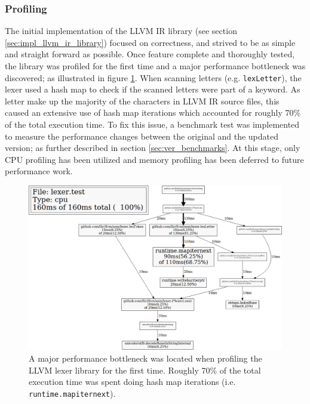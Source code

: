 
\subsubsection{Profiling}
\label{sec:ver_profiling}

The initial implementation of the LLVM IR library (see section \ref{sec:impl_llvm_ir_library}) focused on correctness, and strived to be as simple and straight forward as possible. Once feature complete and thoroughly tested, the library was profiled for the first time and a major performance bottleneck was discovered; as illustrated in figure \ref{fig:lexer_pprof}. When scanning letters (e.g. \texttt{lexLetter}), the lexer used a hash map to check if the scanned letters were part of a keyword. As letter make up the majority of the characters in LLVM IR source files, this caused an extensive use of hash map iterations which accounted for roughly 70\% of the total execution time. To fix this issue, a benchmark test was implemented to measure the performance changes between the original and the updated version; as further described in section \ref{sec:ver_benchmarks}. At this stage, only CPU profiling has been utilized and memory profiling has been deferred to future performance work.

\begin{figure}[htbp]
	\begin{center}
		\includegraphics[width=\textwidth]{inc/8_ver/lexer_pprof.png}
		\caption{A major performance bottleneck was located when profiling the LLVM lexer library for the first time. Roughly 70\% of the total execution time was spent doing hash map iterations (i.e. \texttt{runtime.mapiternext}).}
		\label{fig:lexer_pprof}
	\end{center}
\end{figure}
